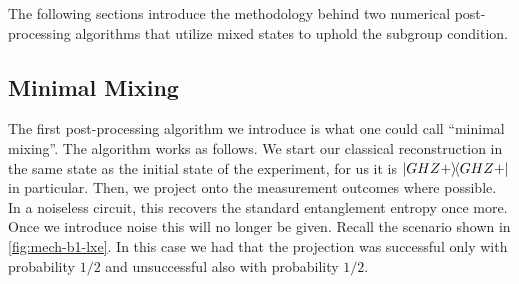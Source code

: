 The following sections introduce the methodology behind two numerical
post-processing algorithms that utilize mixed states to uphold the subgroup
condition. 

\subsection{Minimal Mixing}\label{sec:minimal-mixing}

The first post-processing algorithm we introduce is what one could call
\enquote{minimal mixing}. The algorithm works as follows. We start our
classical reconstruction in the same state as the initial state of the
experiment, for us it is $\dyad{GHZ+}$ in particular. Then, we project onto the
measurement outcomes where possible. In a noiseless circuit, this recovers the
standard entanglement entropy once more. Once we introduce noise this will no
longer be given. Recall the scenario shown in \cref{fig:mech-b1-lxe}. In this
case we had that the projection was successful only with probability
$1 /2$ and unsuccessful also with probability $1 /2$.

